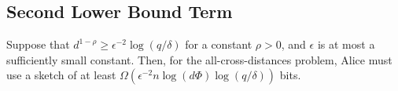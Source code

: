%
%

\subsection{Second Lower Bound Term}

\begin{lemma}\label{lmm:lb2}
Suppose that $d^{1-\rho}\geq\epsilon^{-2}\log(q/\delta)$ for a constant $\rho>0$, and $\epsilon$ is at most a sufficiently small constant.
Then, for the all-cross-distances problem, Alice must use a sketch of at least $\Omega(\epsilon^{-2}n\log(d\Phi)\log(q/\delta))$ bits.
\end{lemma}

